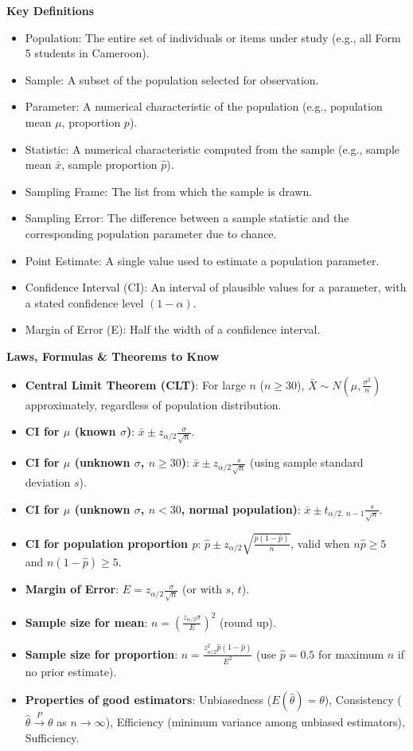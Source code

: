 \documentclass[11pt]{article}
\newcommand{\cle}[1]{{\popxbold\color{popdark}#1}}
\begin{document}
\begin{bilan}

\textbf{Key Definitions}
\begin{itemize}
\item \cle{Population}: The entire set of individuals or items under study (e.g., all Form 5 students in Cameroon).
\item \cle{Sample}: A subset of the population selected for observation.
\item \cle{Parameter}: A numerical characteristic of the population (e.g., population mean $\mu$, proportion $p$).
\item \cle{Statistic}: A numerical characteristic computed from the sample (e.g., sample mean $\bar{x}$, sample proportion $\hat{p}$).
\item \cle{Sampling Frame}: The list from which the sample is drawn.
\item \cle{Sampling Error}: The difference between a sample statistic and the corresponding population parameter due to chance.
\item \cle{Point Estimate}: A single value used to estimate a population parameter.
\item \cle{Confidence Interval (CI)}: An interval of plausible values for a parameter, with a stated confidence level $(1-\alpha)$.
\item \cle{Margin of Error (E)}: Half the width of a confidence interval.
\end{itemize}

\textbf{Laws, Formulas \& Theorems to Know}
\begin{itemize}
\item \textbf{Central Limit Theorem (CLT)}: For large $n$ ($n\ge 30$), $\bar{X}\sim N\!\left(\mu,\frac{\sigma^2}{n}\right)$ approximately, regardless of population distribution.
\item \textbf{CI for $\mu$ (known $\sigma$)}: $\bar{x}\pm z_{\alpha/2}\frac{\sigma}{\sqrt{n}}$.
\item \textbf{CI for $\mu$ (unknown $\sigma$, $n\ge 30$)}: $\bar{x}\pm z_{\alpha/2}\frac{s}{\sqrt{n}}$ (using sample standard deviation $s$).
\item \textbf{CI for $\mu$ (unknown $\sigma$, $n<30$, normal population)}: $\bar{x}\pm t_{\alpha/2,\,n-1}\frac{s}{\sqrt{n}}$.
\item \textbf{CI for population proportion $p$}: $\hat{p}\pm z_{\alpha/2}\sqrt{\frac{\hat{p}(1-\hat{p})}{n}}$, valid when $n\hat{p}\ge5$ and $n(1-\hat{p})\ge5$.
\item \textbf{Margin of Error}: $E = z_{\alpha/2}\frac{\sigma}{\sqrt{n}}$ (or with $s$, $t$).
\item \textbf{Sample size for mean}: $n = \left(\frac{z_{\alpha/2}\sigma}{E}\right)^2$ (round up).
\item \textbf{Sample size for proportion}: $n = \frac{z_{\alpha/2}^2 \hat{p}(1-\hat{p})}{E^2}$ (use $\hat{p}=0.5$ for maximum $n$ if no prior estimate).
\item \textbf{Properties of good estimators}: Unbiasedness ($E(\hat{\theta})=\theta$), Consistency ($\hat{\theta}\xrightarrow{P}\theta$ as $n\to\infty$), Efficiency (minimum variance among unbiased estimators), Sufficiency.
\end{itemize}


\end{bilan}
\end{document}
